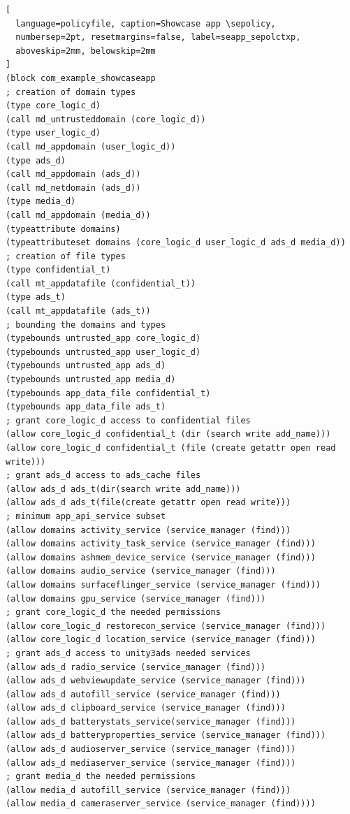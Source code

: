 \begin{lstlisting}[
  language=policyfile, caption=Showcase app \sepolicy,
  numbersep=2pt, resetmargins=false, label=seapp_sepolctxp,
  aboveskip=2mm, belowskip=2mm
]
(block com_example_showcaseapp
; creation of domain types
(type core_logic_d)
(call md_untrusteddomain (core_logic_d))
(type user_logic_d)
(call md_appdomain (user_logic_d))
(type ads_d)
(call md_appdomain (ads_d))
(call md_netdomain (ads_d))
(type media_d)
(call md_appdomain (media_d))
(typeattribute domains)
(typeattributeset domains (core_logic_d user_logic_d ads_d media_d))
; creation of file types
(type confidential_t)
(call mt_appdatafile (confidential_t))
(type ads_t)
(call mt_appdatafile (ads_t))
; bounding the domains and types
(typebounds untrusted_app core_logic_d)
(typebounds untrusted_app user_logic_d)
(typebounds untrusted_app ads_d)
(typebounds untrusted_app media_d)	
(typebounds app_data_file confidential_t)
(typebounds app_data_file ads_t)
; grant core_logic_d access to confidential files
(allow core_logic_d confidential_t (dir (search write add_name)))
(allow core_logic_d confidential_t (file (create getattr open read write)))
; grant ads_d access to ads_cache files
(allow ads_d ads_t(dir(search write add_name)))
(allow ads_d ads_t(file(create getattr open read write)))
; minimum app_api_service subset
(allow domains activity_service (service_manager (find)))
(allow domains activity_task_service (service_manager (find)))
(allow domains ashmem_device_service (service_manager (find)))
(allow domains audio_service (service_manager (find)))
(allow domains surfaceflinger_service (service_manager (find)))
(allow domains gpu_service (service_manager (find)))
; grant core_logic_d the needed permissions
(allow core_logic_d restorecon_service (service_manager (find)))
(allow core_logic_d location_service (service_manager (find)))
; grant ads_d access to unity3ads needed services
(allow ads_d radio_service (service_manager (find)))
(allow ads_d webviewupdate_service (service_manager (find)))
(allow ads_d autofill_service (service_manager (find)))
(allow ads_d clipboard_service (service_manager (find)))
(allow ads_d batterystats_service(service_manager (find)))
(allow ads_d batteryproperties_service (service_manager (find)))
(allow ads_d audioserver_service (service_manager (find)))
(allow ads_d mediaserver_service (service_manager (find)))
; grant media_d the needed permissions
(allow media_d autofill_service (service_manager (find)))
(allow media_d cameraserver_service (service_manager (find))))
\end{lstlisting}


